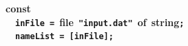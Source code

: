 {\bf const}\\
~~{\bf \verb&inFile&}~{\bf \verb&=&}~{\bf file}~{\bf \verb&"input.dat"&}~{\bf of}~{\bf string}{\bf \verb&;&}\\
~~{\bf \verb&nameList&}~{\bf \verb&=&}~{\bf \verb&[&}{\bf \verb&inFile&}{\bf \verb&]&}{\bf \verb&;&}\\
